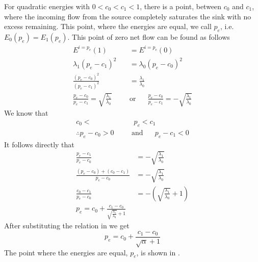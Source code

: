 For quadratic energies with $0 < c_0 < c_1 < 1$, there is a point, between $c_0$ and $c_1$, where the incoming flow from the source completely saturates the sink with no excess remaining. This point, where the energies are equal, we call $p_e$, i.e. $E_0(p_e) = E_1(p_e)$. This point of zero net flow can be found as follows
\begin{equation*}\begin{split}
	E^{i=p_e}(1) & = E^{i=p_e}(0) \\
	\lambda_1(p_e - c_1)^2 & = \lambda_0(p_e - c_0)^2 \\
	\frac{(p_e - c_0)^2}{(p_e - c_1)^2} & = \frac{\lambda_1}{\lambda_0}\\
	\frac{p_e - c_0}{p_e - c_1}  = \sqrt{\frac{\lambda_1}{\lambda_0}} \hspace{20pt}&\text{or}\hspace{20pt}\frac{p_e - c_0}{p_e - c_1}  = -\sqrt{\frac{\lambda_1}{\lambda_0}}
\end{split}\end{equation*}
We know that 
\begin{equation*}\begin{split}
	c_0 < &\,\, p_e < c_1 \\
	\therefore p_e-c_0 >0 \hspace{20pt}&\text{and}\hspace{20pt} p_e-c_1 < 0 
\end{split}\end{equation*}
It follows directly that
\begin{equation*}\begin{split}
	\frac{p_e-c_1}{p_e-c_0} &= -\sqrt{\frac{\lambda_1}{\lambda_0}} \\
	\frac{(p_e-c_0)+(c_0-c_1)}{p_e-c_0} &= -\sqrt{\frac{\lambda_1}{\lambda_0}}\\
	\frac{c_0-c_1}{p_e-c_0} &= -\left( \sqrt{\frac{\lambda_1}{\lambda_0}} + 1\right)\\
	p_e = c_0 + \frac{c_1-c_0}{\sqrt{\frac{\lambda_1}{\lambda_0}} + 1}
\end{split}\end{equation*}
After substituting the relation in  we get
\begin{equation}
	p_e = c_0 + \frac{c_1-c_0}{\sqrt{\alpha} + 1}
	\label{eq:pe}
\end{equation}
The point where the energies are equal, $p_e$, is shown in .

